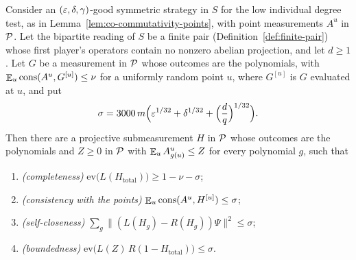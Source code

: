 \begin{lemma}
\label{lem:co-self-improvement}
\leanok
Consider an $(\eps, \delta, \gamma)$-good symmetric strategy in $S$ for the low individual degree
test, as in Lemma~\ref{lem:co-commutativity-points}, with point measurements $A^u$ in $\cal{P}$.
Let the bipartite reading of $S$ be a finite pair (Definition~\ref{def:finite-pair}) whose first
player's operators contain no nonzero abelian projection, and let $d \geq 1$. Let $G$ be a
measurement in $\cal{P}$ whose outcomes are the polynomials, with $\E_u \mathrm{cons}(A^u,
G^{[u]}) \leq \nu$ for a uniformly random point $u$, where $G^{[u]}$ is $G$ evaluated at $u$, and
put
\[
  \sigma = 3000\, m \Bigl(\eps^{1/32} + \delta^{1/32} + \Bigl(\frac{d}{q}\Bigr)^{1/32}\Bigr).
\]
Then there are a projective submeasurement $H$ in $\cal{P}$ whose outcomes are the polynomials
and $Z \geq 0$ in $\cal{P}$ with $\E_u A^u_{g(u)} \leq Z$ for every polynomial $g$, such that
\begin{enumerate}
  \item \emph{(completeness)} $\mathrm{ev}\bigl(L(H_{\mathrm{total}})\bigr) \geq 1 - \nu - \sigma$;
  \item \emph{(consistency with the points)} $\E_u \mathrm{cons}(A^u, H^{[u]}) \leq \sigma$;
  \item \emph{(self-closeness)} $\sum_g \| (L(H_g) - R(H_g)) \Psi \|^2 \leq \sigma$;
  \item \emph{(boundedness)} $\mathrm{ev}\bigl(L(Z)\, R(1 - H_{\mathrm{total}})\bigr) \leq \sigma$.
\end{enumerate}
\end{lemma}

